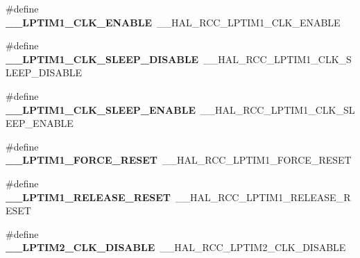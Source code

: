 \begin{DoxyCompactItemize}
\item 
\#define {\bfseries \+\_\+\+\_\+\+L\+P\+T\+I\+M1\+\_\+\+C\+L\+K\+\_\+\+E\+N\+A\+B\+LE}~\+\_\+\+\_\+\+H\+A\+L\+\_\+\+R\+C\+C\+\_\+\+L\+P\+T\+I\+M1\+\_\+\+C\+L\+K\+\_\+\+E\+N\+A\+B\+LE\hypertarget{group___h_a_l___r_c_c___aliased_gae24b86ed5b928dd5f5702e92a28547cf}{}\label{group___h_a_l___r_c_c___aliased_gae24b86ed5b928dd5f5702e92a28547cf}

\item 
\#define {\bfseries \+\_\+\+\_\+\+L\+P\+T\+I\+M1\+\_\+\+C\+L\+K\+\_\+\+S\+L\+E\+E\+P\+\_\+\+D\+I\+S\+A\+B\+LE}~\+\_\+\+\_\+\+H\+A\+L\+\_\+\+R\+C\+C\+\_\+\+L\+P\+T\+I\+M1\+\_\+\+C\+L\+K\+\_\+\+S\+L\+E\+E\+P\+\_\+\+D\+I\+S\+A\+B\+LE\hypertarget{group___h_a_l___r_c_c___aliased_ga2794aea3c932ca4bd7d2e001f7e8ce0a}{}\label{group___h_a_l___r_c_c___aliased_ga2794aea3c932ca4bd7d2e001f7e8ce0a}

\item 
\#define {\bfseries \+\_\+\+\_\+\+L\+P\+T\+I\+M1\+\_\+\+C\+L\+K\+\_\+\+S\+L\+E\+E\+P\+\_\+\+E\+N\+A\+B\+LE}~\+\_\+\+\_\+\+H\+A\+L\+\_\+\+R\+C\+C\+\_\+\+L\+P\+T\+I\+M1\+\_\+\+C\+L\+K\+\_\+\+S\+L\+E\+E\+P\+\_\+\+E\+N\+A\+B\+LE\hypertarget{group___h_a_l___r_c_c___aliased_ga517cc9953c8cdb3b4ea249401bf2cf3b}{}\label{group___h_a_l___r_c_c___aliased_ga517cc9953c8cdb3b4ea249401bf2cf3b}

\item 
\#define {\bfseries \+\_\+\+\_\+\+L\+P\+T\+I\+M1\+\_\+\+F\+O\+R\+C\+E\+\_\+\+R\+E\+S\+ET}~\+\_\+\+\_\+\+H\+A\+L\+\_\+\+R\+C\+C\+\_\+\+L\+P\+T\+I\+M1\+\_\+\+F\+O\+R\+C\+E\+\_\+\+R\+E\+S\+ET\hypertarget{group___h_a_l___r_c_c___aliased_gaef3ee46d85a0a59c82eb8ef772c8061a}{}\label{group___h_a_l___r_c_c___aliased_gaef3ee46d85a0a59c82eb8ef772c8061a}

\item 
\#define {\bfseries \+\_\+\+\_\+\+L\+P\+T\+I\+M1\+\_\+\+R\+E\+L\+E\+A\+S\+E\+\_\+\+R\+E\+S\+ET}~\+\_\+\+\_\+\+H\+A\+L\+\_\+\+R\+C\+C\+\_\+\+L\+P\+T\+I\+M1\+\_\+\+R\+E\+L\+E\+A\+S\+E\+\_\+\+R\+E\+S\+ET\hypertarget{group___h_a_l___r_c_c___aliased_gad894e461dd243be2f7107de7b94d5e4f}{}\label{group___h_a_l___r_c_c___aliased_gad894e461dd243be2f7107de7b94d5e4f}

\item 
\#define {\bfseries \+\_\+\+\_\+\+L\+P\+T\+I\+M2\+\_\+\+C\+L\+K\+\_\+\+D\+I\+S\+A\+B\+LE}~\+\_\+\+\_\+\+H\+A\+L\+\_\+\+R\+C\+C\+\_\+\+L\+P\+T\+I\+M2\+\_\+\+C\+L\+K\+\_\+\+D\+I\+S\+A\+B\+LE\hypertarget{group___h_a_l___r_c_c___aliased_gae4daf45ea16d3d30f8118ca34c8a4519}{}\label{group___h_a_l___r_c_c___aliased_gae4daf45ea16d3d30f8118ca34c8a4519}


\end{DoxyCompactItemize}
